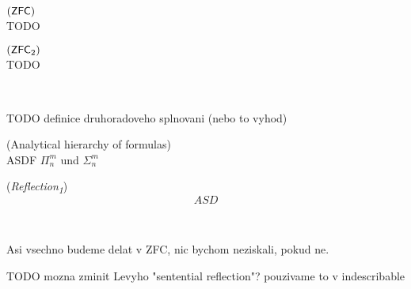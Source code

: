 \begin{definition}{$(\sf{ZFC})$}\label{def:zfc}\\
TODO
\end{definition}

\begin{definition}{$(\sf{ZFC\textsubscript{2}})$}\label{def:zfc_2}\\
TODO
\end{definition}

\

TODO definice druhoradoveho splnovani (nebo to vyhod)

\begin{definition}{(Analytical hierarchy of formulas)}\\
\label{def:analytical_hierarchy}
ASDF 
$\Pi^m_n$ und $\Sigma^m_n$ 
\end{definition}


\begin{definition}{(\emph{Reflection\textsubscript{1}})}\label{def:reflection_1}\\
\begin{equation}
ASD
\end{equation}
\end{definition}

\

Asi vsechno budeme delat v ZFC, nic bychom neziskali, pokud ne.

TODO mozna zminit Levyho "sentential reflection"? pouzivame to v indescribable

\begin{comment}

Kanamori v reflexi rika, ze pro $\varphi$ a libovolny $\beta \in Ord$ existuje $\alpha$ ze $\varphi^{V_\alpha} \iff \varphi$ (s parametrama $x_1, \ldots, x_n \in V_\alpha$)


Prepsat modelovy veci do "kanamoriho notace" $<V_\kappa, \in, R>$ kde $R$ je nejaka relace\\
\prec !!
\end{comment}
